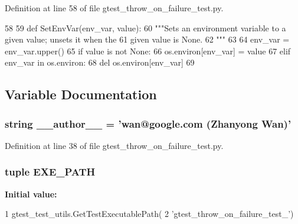 \-Definition at line 58 of file gtest\-\_\-throw\-\_\-on\-\_\-failure\-\_\-test.\-py.


\begin{DoxyCode}
58 
59 def SetEnvVar(env_var, value):
60   """Sets an environment variable to a given value; unsets it when the
61   given value is None.
62   """
63 
64   env_var = env_var.upper()
65   if value is not None:
66     os.environ[env_var] = value
67   elif env_var in os.environ:
68     del os.environ[env_var]
69 

\end{DoxyCode}


\subsection{\-Variable \-Documentation}
\hypertarget{namespacegtest__throw__on__failure__test_a629d61dfe4da763164a4d1a2d85b0afd}{
\subsubsection[{\-\_\-\-\_\-author\-\_\-\-\_\-}]{\setlength{\rightskip}{0pt plus 5cm}string {\bf \-\_\-\-\_\-author\-\_\-\-\_\-} = 'wan@google.\-com (\-Zhanyong \-Wan)'}}\label{df/da6/namespacegtest__throw__on__failure__test_a629d61dfe4da763164a4d1a2d85b0afd}


\-Definition at line 38 of file gtest\-\_\-throw\-\_\-on\-\_\-failure\-\_\-test.\-py.

\hypertarget{namespacegtest__throw__on__failure__test_a216df3f485400b109390103528720888}{
\subsubsection[{\-E\-X\-E\-\_\-\-P\-A\-T\-H}]{\setlength{\rightskip}{0pt plus 5cm}tuple {\bf \-E\-X\-E\-\_\-\-P\-A\-T\-H}}}\label{df/da6/namespacegtest__throw__on__failure__test_a216df3f485400b109390103528720888}
{\bfseries \-Initial value\-:}
\begin{DoxyCode}
1 gtest_test_utils.GetTestExecutablePath(
2     'gtest_throw_on_failure_test_')
\end{DoxyCode}


